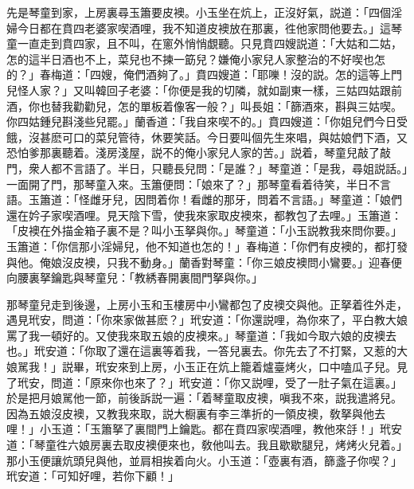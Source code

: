 先是琴童到家，上房裏尋玉簫要皮襖。小玉坐在炕上，正沒好氣，説道：「四個淫婦今日都在賁四老婆家喫酒哩，我不知道皮襖放在那裏，徃他家問他要去。」這琴童一直走到賁四家，且不叫，在窻外悄悄覷聽。只見賁四嫂説道：「大姑和二姑，怎的這半日酒也不上，菜兒也不揀一筯兒？嫌俺小家兒人家整治的不好喫也怎的？」春梅道：「四嫂，俺們酒夠了。」賁四嫂道：「耶嚛！沒的説。怎的這等上門兒怪人家？」又叫韓回子老婆：「你便是我的切隣，就如副東一樣，三姑四姑跟前酒，你也替我勸勸兒，怎的單板着像客一般？」叫長姐：「篩酒來，斟與三姑喫。你四姑鍾兒斟淺些兒罷。」蘭香道：「我自來喫不的。」賁四嫂道：「你姐兒們今日受餓，沒甚麽可口的菜兒管待，休要笑話。今日要叫個先生來唱，與姑娘們下酒，又恐怕爹那裏聽着。淺房淺屋，説不的俺小家兒人家的苦。」説着，琴童兒敲了敲門，衆人都不言語了。半日，只聽長兒問：「是誰？」琴童道：「是我，尋姐説話。」一面開了門，那琴童入來。玉簫便問：「娘來了？」那琴童看着待笑，半日不言語。玉簫道：「怪雌牙兒，因問着你！看雌的那牙，問着不言語。」琴童道：「娘們還在妗子家喫酒哩。見天陰下雪，使我來家取皮襖來，都教包了去哩。」玉簫道：「皮襖在外描金箱子裏不是？叫小玉拏與你。」琴童道：「小玉説教我來問你要。」玉簫道：「你信那小淫婦兒，他不知道也怎的！」春梅道：「你們有皮襖的，都打發與他。俺娘沒皮襖，只我不動身。」蘭香對琴童：「你三娘皮襖問小鸞要。」迎春便向腰裏拏鑰匙與琴童兒：「教綉春開裏間門拏與你。」

那琴童兒走到後邊，上房小玉和玉樓房中小鸞都包了皮襖交與他。正拏着徃外走，遇見玳安，問道：「你來家做甚麽？」玳安道：「你還説哩，為你來了，平白教大娘罵了我一頓好的。又使我來取五娘的皮襖來。」琴童道：「我如今取六娘的皮襖去也。」玳安道：「你取了還在這裏等着我，一答兒裏去。你先去了不打緊，又惹的大娘駡我！」説畢，玳安來到上房，小玉正在炕上籠着爐臺烤火，口中嗑瓜子兒。見了玳安，問道：「原來你也來了？」玳安道：「你又説哩，受了一肚子氣在這裏。」於是把月娘駡他一節，前後訴説一遍：「着琴童取皮襖，嗔我不來，説我遣將兒。因為五娘沒皮襖，又教我來取，説大橱裏有李三準折的一領皮襖，敎拏與他去哩！」小玉道：「玉簫拏了裏間門上鑰匙。都在賁四家喫酒哩，教他來㧱！」玳安道：「琴童徃六娘房裏去取皮襖便來也，敎他叫去。我且歇歇腿兒，烤烤火兒着。」那小玉便讓炕頭兒與他，並肩相挨着向火。小玉道：「壺裏有酒，篩盞子你喫？」玳安道：「可知好哩，若你下顧！」

